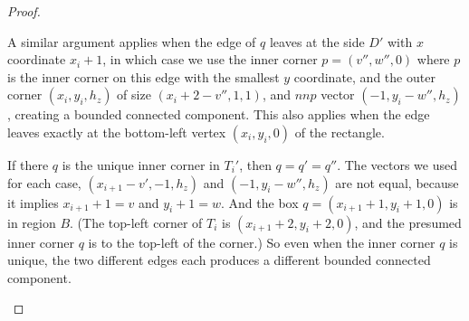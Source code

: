 \documentclass{amsart}[10pt]
\theoremstyle{plain}
\theoremstyle{definition}
\begin{document}
\begin{proof}
\begin{enumerate}
A similar argument applies when the edge of $q$ leaves at the side $D'$ with $x$ coordinate $x_i+1$, in which case we use the inner corner $p=(v'', w'', 0)$ where $p$ is the inner corner on this edge with the smallest $y$ coordinate, and the outer corner $(x_{i}, y_{i},h_z)$ of size $(x_i+2-v'',1,1)$, and $nnp$ vector $(-1, y_i-w'', h_z)$, creating a bounded connected component. This also applies when the edge leaves exactly at the bottom-left vertex $(x_{i},y_{i},0)$ of the rectangle. 

If there $q$ is the unique inner corner in $T_i'$, then $q=q'=q''$. The vectors we used for each case, $(x_{i+1}-v',-1,h_z)$ and $(-1, y_i-w'', h_z)$ are not equal, because it implies $x_{i+1}+1=v$ and $y_i+1=w$. And the box $q=(x_{i+1}+1, y_i+1,0)$ is in region $B$. (The top-left corner of $T_i$ is $(x_{i+1}+2, y_i+2,0)$, and the presumed inner corner $q$ is to the top-left of the corner.) So even when the inner corner $q$ is unique, the two different edges each produces a different bounded connected component.


\end{enumerate}
\end{proof}
\end{document}
